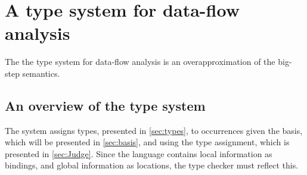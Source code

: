 \documentclass[acmsmall,sigplan]{acmart}
\begin{document}
\iffalse
\begin{example}[Data-flow for abstractions]\label{ex:DFAbs}
The following program creates a local binding to the identity function and applies it twice.

\begin{lstlisting}[language=Caml, mathescape=true]
(let x ($\lambda$ y.(y$^1$))$^2$ (let z (x$^3$ 1$^4$)$^5$ (x$^6$ 2$^7$)$^{8}$)$^{9}$)$^{10}$
\end{lstlisting}
The transition tree can be found in \cref{FigEx.Abs}.
In the transition tree, we see that $\psi$ is extended a couple of times, where we will take a look at a couple of interesting extensions to $\psi$
The first time we evaluate the abstraction body, $\psi$ is on the following form:

$$\psi_2=(w_2=[x^{2}\mapsto(\emptyset,\emptyset), y^{4}\mapsto(\emptyset,\emptyset)],\sqsubseteq_w^2=\emptyset)$$
Here, the lookup of the parameter $y$ is simple, as there are only one occurrence, where we then know that $inf_{\psi_2}(y)=4$.

The second time we evaluate the body of the abstraction, $\psi$ is 
%
\[ \psi_3=(w_3=[x^{2}\mapsto(\emptyset,\emptyset),
  y^{4}\mapsto(\emptyset,\emptyset),
  y^{7}\mapsto(\emptyset,\emptyset)],\sqsubseteq_w^2=\{4,7\}) \]
Here, we now have two bindings for the parameter $y$, but since we also know that there are an ordering for the two occurrences of $y$, we then know that the program point $7$ is evaluated after $4$, as such we know that $inf_{\psi_3}(y)=7$.
\end{example}

\begin{landscape}

\end{landscape}
\fi

\section{A type system for data-flow analysis}\label{sec:TypeSys}

The the type system for data-flow analysis is an overapproximation of
the big-step semantics.

\subsection{An overview of the type system}

The system assigns types, presented in \cref{sec:types}, to
occurrences given the basis, which will be presented in
\cref{sec:basis}, and using the type assignment, which is presented in
\cref{sec:Judge}. 
Since the language contains local information as bindings, and global
information as locations, the type checker must reflect this.
\end{document}
